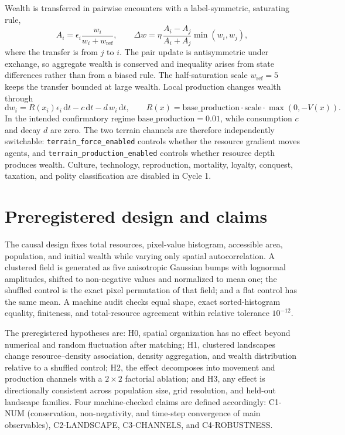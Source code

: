 \documentclass[aps,prl,reprint,superscriptaddress,amsmath,amssymb]{revtex4-2}
\begin{document}
Wealth is transferred in pairwise encounters with a label-symmetric, saturating rule,
\begin{equation}
A_i=\epsilon_i\frac{w_i}{w_i+w_{\mathrm{ref}}},
\qquad
\Delta w=\eta\,\frac{A_i-A_j}{A_i+A_j}\min(w_i,w_j),
\label{eq:exchange}
\end{equation}
where the transfer is from $j$ to $i$. The pair update is antisymmetric under exchange, so aggregate wealth is conserved and inequality arises from state differences rather than from a biased rule. The half-saturation scale $w_{\mathrm{ref}}=5$ keeps the transfer bounded at large wealth. Local production changes wealth through
\begin{equation}
\mathrm{d}w_i=R(x_i)\epsilon_i\,\mathrm{d}t-c\,\mathrm{d}t-d\,w_i\,\mathrm{d}t,
\qquad
R(x)=\mathrm{base\_production}\cdot\mathrm{scale}\cdot\max(0,-V(x)).
\label{eq:production}
\end{equation}
In the intended confirmatory regime $\mathrm{base\_production}=0.01$, while consumption $c$ and decay $d$ are zero. The two terrain channels are therefore independently switchable: \texttt{terrain\_force\_enabled} controls whether the resource gradient moves agents, and \texttt{terrain\_production\_enabled} controls whether resource depth produces wealth. Culture, technology, reproduction, mortality, loyalty, conquest, taxation, and polity classification are disabled in Cycle 1.

\section{Preregistered design and claims}

The causal design fixes total resources, pixel-value histogram, accessible area, population, and initial wealth while varying only spatial autocorrelation. A clustered field is generated as five anisotropic Gaussian bumps with lognormal amplitudes, shifted to non-negative values and normalized to mean one; the shuffled control is the exact pixel permutation of that field; and a flat control has the same mean. A machine audit checks equal shape, exact sorted-histogram equality, finiteness, and total-resource agreement within relative tolerance $10^{-12}$.

The preregistered hypotheses are: H0, spatial organization has no effect beyond numerical and random fluctuation after matching; H1, clustered landscapes change resource--density association, density aggregation, and wealth distribution relative to a shuffled control; H2, the effect decomposes into movement and production channels with a $2\times2$ factorial ablation; and H3, any effect is directionally consistent across population size, grid resolution, and held-out landscape families. Four machine-checked claims are defined accordingly: C1-NUM (conservation, non-negativity, and time-step convergence of main observables), C2-LANDSCAPE, C3-CHANNELS, and C4-ROBUSTNESS.
\end{document}
